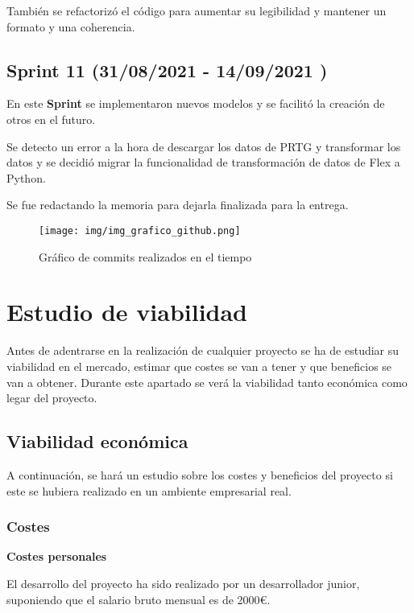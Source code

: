 También se refactorizó el código para aumentar su legibilidad y mantener un formato y una coherencia.

\subsection{Sprint 11  (31/08/2021 - 14/09/2021 )}
En este \textbf{Sprint} se implementaron nuevos modelos y se facilitó la creación de otros en el futuro.

Se detecto un error a la hora de descargar los datos de PRTG y transformar los datos y se decidió migrar la funcionalidad de transformación de datos de Flex a Python.

Se fue redactando la memoria para dejarla finalizada para la entrega.


\begin{figure}[h]
	\centering
	\texttt{[image: img/img\_grafico\_github.png]}
	\caption{Gráfico de commits realizados en el tiempo}
	\label{img_grafico_github}
\end{figure}
\newpage

\section{Estudio de viabilidad}

Antes de adentrarse en la realización de cualquier proyecto se ha de estudiar su viabilidad en el mercado, estimar que costes se van a tener y que beneficios se van a obtener. Durante este apartado se verá la viabilidad tanto económica como legar del proyecto.

\subsection{Viabilidad económica}
A continuación, se hará un estudio sobre los costes y beneficios del proyecto si este se hubiera realizado en un ambiente empresarial real.

\subsubsection{Costes}
\textbf{Costes personales}

El desarrollo del proyecto ha sido realizado por un desarrollador junior, suponiendo que el salario bruto mensual es de 2000€.


